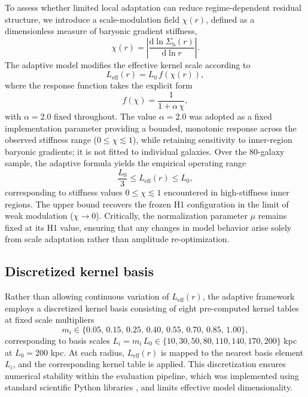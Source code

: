 \documentclass{aa}
\begin{document}
To assess whether limited local adaptation can reduce regime-dependent 
residual structure, we introduce a scale-modulation field $\chi(r)$, 
defined as a dimensionless measure of baryonic gradient stiffness,
\begin{equation}
	\chi(r) = \left| \frac{\mathrm{d} \ln \Sigma_{\mathrm{b}}(r)}
	{\mathrm{d} \ln r} \right|.
	\label{eq:chi}
\end{equation}
The adaptive model modifies the effective kernel scale according to
\begin{equation}
	L_{\mathrm{eff}}(r) = L_0 \, f(\chi(r)),
	\label{eq:leff}
\end{equation}
where the response function takes the explicit form
\begin{equation}
	f(\chi) = \frac{1}{1 + \alpha\,\chi},
	\label{eq:fchi}
\end{equation}
with $\alpha = 2.0$ fixed throughout. The value $\alpha = 2.0$ was
adopted as a fixed implementation parameter providing a bounded, monotonic
response across the observed stiffness range ($0 \leq \chi \lesssim 1$),
while retaining sensitivity to inner-region baryonic gradients; it is not
fitted to individual galaxies. Over the 80-galaxy sample, the
adaptive formula yields the empirical operating range
\begin{equation}
	\frac{L_0}{3} \leq L_{\mathrm{eff}}(r) \leq L_0,
	\label{eq:bound}
\end{equation}
corresponding to stiffness values $0 \leq \chi \lesssim 1$ encountered
in high-stiffness inner regions. The upper bound recovers the frozen H1
configuration in the limit of weak modulation ($\chi \to 0$).
Critically, the normalization parameter $\mu$ remains fixed at its H1 value,
ensuring that any changes in model behavior arise solely from scale
adaptation rather than amplitude re-optimization.

\subsection{Discretized kernel basis}

Rather than allowing continuous variation of $L_{\mathrm{eff}}(r)$, the
adaptive framework employs a discretized kernel basis consisting of eight
pre-computed kernel tables at fixed scale multipliers
\begin{equation}
	m_i \in \{0.05,\,0.15,\,0.25,\,0.40,\,0.55,\,0.70,\,0.85,\,1.00\},
	\label{eq:basis}
\end{equation}
corresponding to basis scales $L_i = m_i \, L_0 \in \{10, 30, 50, 80, 110, 140, 170, 200\}$ kpc
at $L_0 = 200$ kpc. At each radius, $L_{\mathrm{eff}}(r)$ is mapped to the
nearest basis element $L_i$, and the corresponding kernel table is applied.
This discretization ensures numerical stability within the evaluation pipeline,
which was implemented using standard scientific Python libraries
\citep{numpy2020, scipy2020}, and limits effective model dimensionality.
\end{document}
